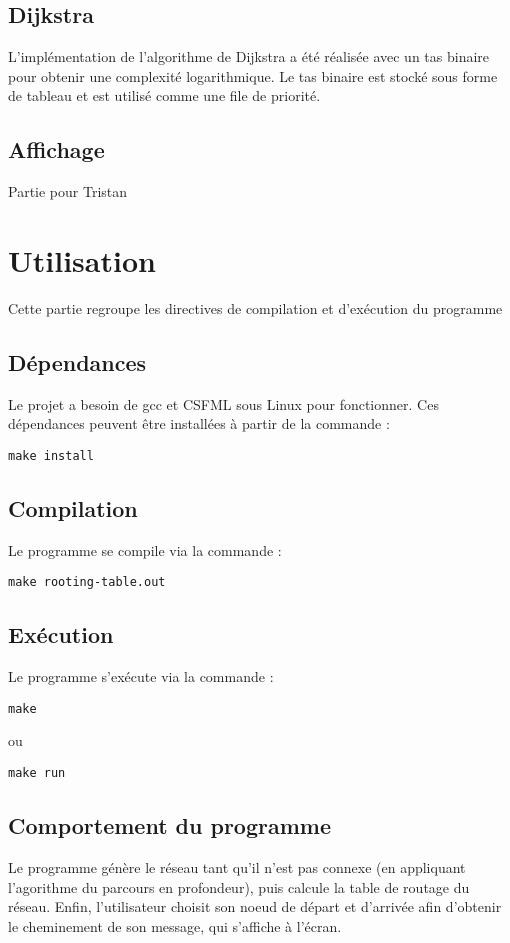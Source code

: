 \documentclass{article}
\begin{document}
\subsection{Dijkstra}
L'implémentation de l'algorithme de Dijkstra a été réalisée avec un tas binaire pour obtenir une complexité logarithmique.
Le tas binaire est stocké sous forme de tableau et est utilisé comme une file de priorité.

\subsection{Affichage}
Partie pour Tristan

\break\section{Utilisation}
Cette partie regroupe les directives de compilation et d'exécution du programme
\subsection{Dépendances}
Le projet a besoin de gcc et CSFML sous Linux pour fonctionner. Ces dépendances peuvent être installées à partir de la commande :
\begin{verbatim}
make install
\end{verbatim}

\subsection{Compilation}
Le programme se compile via la commande :
\begin{verbatim}
make rooting-table.out
\end{verbatim}

\subsection{Exécution}
Le programme s'exécute via la commande :
\begin{verbatim}
make
\end{verbatim}
ou
\begin{verbatim}
make run
\end{verbatim}

\subsection{Comportement du programme}
Le programme génère le réseau tant qu'il n'est pas connexe (en appliquant l'agorithme du parcours en profondeur), puis calcule la table de routage du réseau. Enfin, l'utilisateur choisit son noeud de départ et d'arrivée afin d'obtenir le cheminement de son message, qui s'affiche à l'écran.
\end{document}

